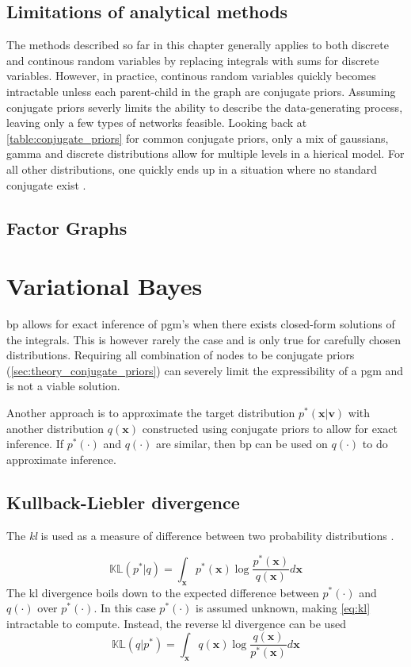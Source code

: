 \subsection{Limitations of analytical methods}
The methods described so far in this chapter generally applies to both discrete and continous random variables by replacing integrals with sums for discrete variables. However, in practice, continous random variables quickly becomes intractable unless each parent-child in the graph are conjugate priors. Assuming conjugate priors severly limits the ability to describe the data-generating process, leaving only a few types of networks feasible. Looking back at \cref{table:conjugate_priors} for common conjugate priors, only a mix of gaussians, gamma and discrete distributions allow for multiple levels in a hierical model. For all other distributions, one quickly ends up in a situation where no standard conjugate exist \cite{winnbishop}. 
\subsection{Factor Graphs}
\section{Variational Bayes}
\acrshort{bp} allows for exact inference of \acrshort{pgm}'s when there exists closed-form solutions of the integrals. This is however rarely the case and is only true for carefully chosen distributions. Requiring all combination of nodes to be conjugate priors (\cref{sec:theory_conjugate_priors}) can severely limit the expressibility of a \acrshort{pgm} and is not a viable solution. 

Another approach is to approximate the target distribution $p^*(\mathbf{x} | \mathbf{v})$ with another distribution $q(\mathbf{x})$ constructed using conjugate priors to allow for exact inference. If $p^*(\cdot)$ and $q(\cdot)$ are similar, then \acrshort{bp} can be used on $q(\cdot)$ to do approximate inference.

\subsection{Kullback-Liebler divergence}
The \textit{\acrfull{kl}}  is used as a measure of difference between two probability distributions \cite{kullback1951,murphy}.

\begin{equation}\label{eq:kl}
    \mathbb{KL}(p^* | q) = \int_\mathbf{x} p^*(\mathbf{x}) \log \frac{p^*(\mathbf{x})}{q(\mathbf{x})} d\mathbf{x}
\end{equation}
The \acrshort{kl} divergence boils down to the expected difference between $p^*(\cdot)$ and $q(\cdot)$ over $p^*(\cdot)$.
In this case $p^*(\cdot)$ is assumed unknown, making \cref{eq:kl} intractable to compute. Instead, the reverse \acrshort{kl} divergence can be used 
\begin{equation}\label{eq:reverse_kl}
    \mathbb{KL}(q | p^*) = \int_\mathbf{x} q(\mathbf{x}) \log \frac{q(\mathbf{x})}{p^*(\mathbf{x})} d\mathbf{x}
\end{equation}


